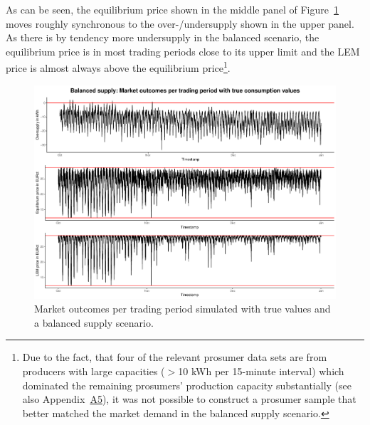 As can be seen, the equilibrium price shown in the middle panel of Figure~\ref{Fig:marketoutcomes_true_balanced} moves roughly synchronous to the over-/undersupply shown in the upper panel. As there is by tendency more undersupply in the balanced scenario, the equilibrium price is in most trading periods close to its upper limit and the LEM price is almost always above the equilibrium price\footnote{Due to the fact, that four of the relevant prosumer data sets are from producers with large capacities ($>$10 kWh per 15-minute interval) which dominated the remaining prosumers' production capacity substantially (see also Appendix~\hyperlink{AppA5:Figures:producer_all}{A5}), it was not possible to construct a prosumer sample that better matched the market demand in the balanced supply scenario.}.
%
\begin{figure}[htbp]
    \centering
    \includegraphics[width=\textwidth]{thesis/graphs/marketsimulation/marketoutcome_true.pdf}
    \caption[Market outcomes simulated with balanced supply and true values]{Market outcomes per trading period simulated with true values and a balanced supply scenario. \quantnet\href{}{}}
    \label{Fig:marketoutcomes_true_balanced}
\end{figure}
%

